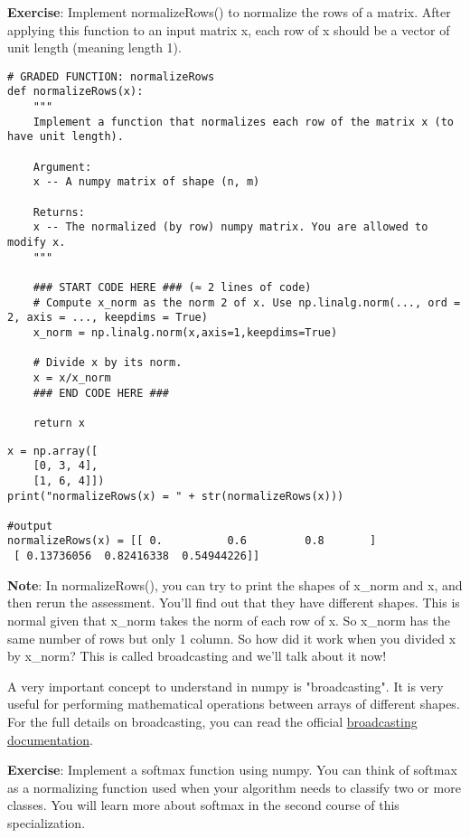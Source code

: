 {\textbf {Exercise}}:  Implement normalizeRows() to normalize the rows of a matrix. After applying this function to an input matrix x, each row of x should be a vector of unit length (meaning length 1).

\begin{verbatim}
# GRADED FUNCTION: normalizeRows
def normalizeRows(x):
    """
    Implement a function that normalizes each row of the matrix x (to have unit length).
    
    Argument:
    x -- A numpy matrix of shape (n, m)
    
    Returns:
    x -- The normalized (by row) numpy matrix. You are allowed to modify x.
    """
    
    ### START CODE HERE ### (≈ 2 lines of code)
    # Compute x_norm as the norm 2 of x. Use np.linalg.norm(..., ord = 2, axis = ..., keepdims = True)
    x_norm = np.linalg.norm(x,axis=1,keepdims=True)
    
    # Divide x by its norm.
    x = x/x_norm
    ### END CODE HERE ###

    return x
\end{verbatim}

\begin{verbatim}
x = np.array([
    [0, 3, 4],
    [1, 6, 4]])
print("normalizeRows(x) = " + str(normalizeRows(x)))

#output
normalizeRows(x) = [[ 0.          0.6         0.8       ]
 [ 0.13736056  0.82416338  0.54944226]]
\end{verbatim}

{\textbf {Note}}: In normalizeRows(), you can try to print the shapes of x\_norm and x, and then rerun the assessment. You'll find out that they have different shapes. This is normal given that x\_norm takes the norm of each row of x. So x\_norm has the same number of rows but only 1 column. So how did it work when you divided x by x\_norm? This is called broadcasting and we'll talk about it now!



\label{Broadcasting}

A very important concept to understand in numpy is "broadcasting". It is very useful for performing mathematical operations between arrays of different shapes. For the full details on broadcasting, you can read the official \href{http://docs.scipy.org/doc/numpy/user/basics.broadcasting.html}{broadcasting documentation}.

{\textbf {Exercise}}: Implement a softmax function using numpy. You can think of softmax as a normalizing function used when your algorithm needs to classify two or more classes. You will learn more about softmax in the second course of this specialization.

